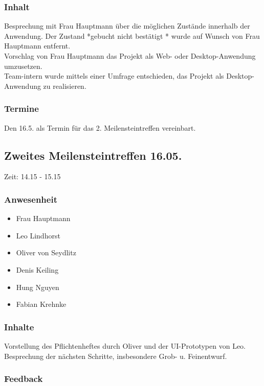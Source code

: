 \subsubsection{Inhalt}
Besprechung mit Frau Hauptmann über die möglichen Zustände innerhalb der Anwendung. Der Zustand *gebucht nicht bestätigt * wurde auf Wunsch von Frau Hauptmann entfernt. 
\\Vorschlag von Frau Hauptmann das Projekt als Web- oder Desktop-Anwendung umzusetzen.
\\Team-intern wurde mittels einer Umfrage entschieden, das Projekt als Desktop-Anwendung zu realisieren.

\subsubsection{Termine}
Den 16.5. als Termin für das 2. Meilensteintreffen vereinbart.



\subsection{Zweites Meilensteintreffen 16.05.}

Zeit: 14.15 - 15.15

\subsubsection{Anwesenheit}
\begin{itemize}
	\item Frau Hauptmann
	\item Leo Lindhorst
	\item Oliver von Seydlitz
	\item Denis Keiling
	\item Hung Nguyen
	\item Fabian Krehnke
\end{itemize}

\subsubsection{Inhalte}
Vorstellung des Pflichtenheftes durch Oliver und der UI-Prototypen von Leo.
\\Besprechung der nächsten Schritte, insbesondere Grob- u. Feinentwurf.

\subsubsection{Feedback}
